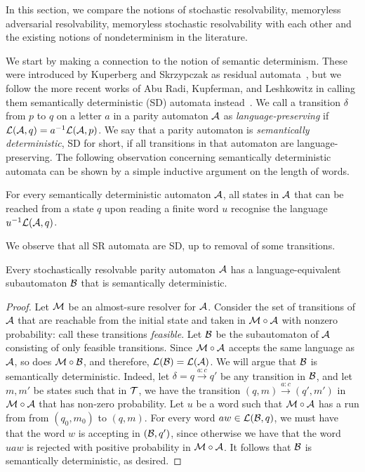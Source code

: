 In this section, we compare the notions of stochastic resolvability, memoryless adversarial resolvability, memoryless stochastic resolvability with each other and the existing notions of nondeterminism in the literature.

We start by making a connection to the notion of semantic determinism. These were introduced by Kuperberg and Skrzypczak as residual automata~\cite{KS15}, but we follow the more recent works of Abu Radi, Kupferman, and Leshkowitz in calling them semantically deterministic (SD) automata instead~\cite{AKL21,AK23}.
We call a transition $\delta$ from $p$ to $q$ on a letter $a$ in a parity automaton $\mathcal{A}$ as \emph{language-preserving} if $\mathcal{L}(\mathcal{A},q) = a^{-1} \mathcal{L}(\mathcal{A},p)$. We say that a parity automaton is \emph{semantically deterministic}, SD for short, if all transitions in that automaton are language-preserving. The following observation concerning semantically deterministic automata can be shown by a simple inductive argument on the length of words.

\begin{observation}\label{lemma:SDautomata}
For every semantically deterministic automaton $\mathcal{A}$, all states in $\mathcal{A}$ that can be reached from a state $q$ upon reading a finite word $u$ recognise the language $u^{-1}\mathcal{L}(\mathcal{A},q)$.%
\end{observation}

We observe that all SR automata are SD, up to removal of some transitions.
\begin{lemma}\label{lemma:SR-implies-SD}
Every stochastically resolvable parity automaton $\mathcal{A}$ has a language-equivalent subautomaton $\mathcal{B}$ that is semantically deterministic.
\end{lemma}
\begin{proof}
Let $\mathcal{M}$ be an almost-sure resolver for $\mathcal{A}$. Consider the set of transitions of $\mathcal{A}$ that are reachable from the initial state and taken in $\mathcal{M} \circ \mathcal{A}$ with nonzero probability: call these transitions \emph{feasible}. Let $\mathcal{B}$ be the subautomaton of $\mathcal{A}$ consisting of only feasible transitions. Since $\mathcal{M}\circ \mathcal{A}$ accepts the same language as $\mathcal{A}$, so does $ \mathcal{M}\circ \mathcal{B}$, and therefore, $\mathcal{L}(\mathcal{B}) = \mathcal{L}(\mathcal{A})$. We will argue that $\mathcal{B}$ is semantically deterministic. Indeed, let $\delta=q\xrightarrow{a:c}q'$ be any transition in $\mathcal{B}$, and let $m,m'$ be states such that in $\mathcal{T}$, we have the transition $(q,m) \xrightarrow{a:c} (q',m')$ in $\mathcal{M} \circ \mathcal{A}$ that has non-zero probability. Let $u$ be a word such that $\mathcal{M} \circ \mathcal{A}$ has a run from from $(q_0,m_0)$ to $(q,m)$. For every word $aw \in \mathcal{L}(\mathcal{B},q)$, we must have that the word $w$ is accepting in $(\mathcal{B},q')$, since otherwise we have that the word $uaw$ is rejected with positive probability in $\mathcal{M}\circ \mathcal{A}$. It follows that $\mathcal{B}$ is semantically deterministic, as desired. 
\end{proof}

